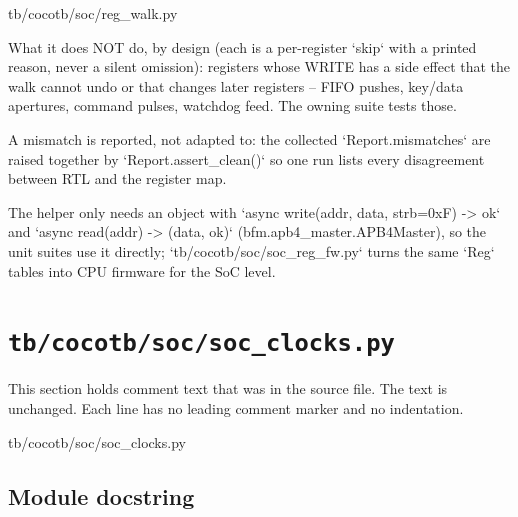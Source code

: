 \begin{relocated}{tb/cocotb/soc/reg_walk.py}
\begin{textblock}
What it does NOT do, by design (each is a per-register `skip` with a printed reason, never a
silent omission): registers whose WRITE has a side effect that the walk cannot undo or that
changes later registers -- FIFO pushes, key/data apertures, command pulses, watchdog feed.  The
owning suite tests those.

A mismatch is reported, not adapted to: the collected `Report.mismatches` are raised together
by `Report.assert_clean()` so one run lists every disagreement between RTL and the register map.

The helper only needs an object with `async write(addr, data, strb=0xF) -> ok` and
`async read(addr) -> (data, ok)` (bfm.apb4_master.APB4Master), so the unit suites use it directly;
`tb/cocotb/soc/soc_reg_fw.py` turns the same `Reg` tables into CPU firmware for the SoC level.
\end{textblock}

\end{relocated}

\section{\texttt{tb/cocotb/soc/soc\_clocks.py}}\label{tm:suite:soc-soc-clocks}

This section holds comment text that was in the source file. The text is unchanged. Each line has no leading comment marker and no indentation.

\begin{relocated}{tb/cocotb/soc/soc_clocks.py}

\subsection*{Module docstring}


\end{relocated}

